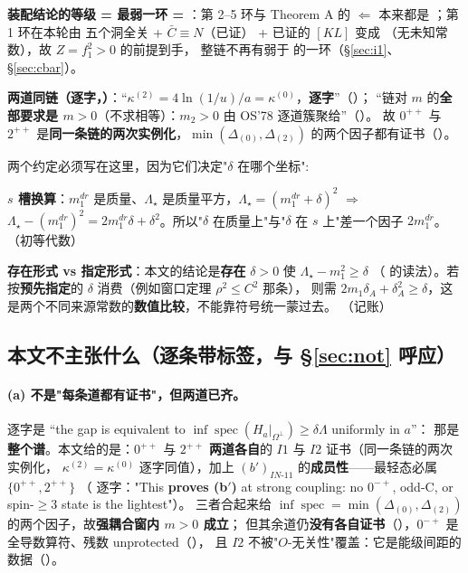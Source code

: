 \textbf{装配结论的等级 = 最弱一环 = \LT}：第 2--5 环与 Theorem A 的 $\Leftarrow$ 本来都是 \LT；第 1 环在本轮由
五个洞全关 + $\bar C\equiv N$（已证） + 已证的 $[KL]$ 变成 \LT{}（无未知常数），故 $Z=f_1^2>0$ 的前提到手，
整链不再有弱于 \LT{} 的一环（\S\ref{sec:i1}、\S\ref{sec:cbar}）。
\begin{quotebox}
\textbf{两道同链（逐字，）}：``$\kappa^{(2)}=4\ln(1/u)/a=\kappa^{(0)}$，\textbf{逐字}''（）；
``链对 $m$ 的\textbf{全部要求是 $m>0$}（不求相等）：$m_2>0$ 由 OS'78 逐道簇聚给''（）。
故 $0^{++}$ 与 $2^{++}$ 是\textbf{同一条链的两次实例化}，$\min(\Delta_{(0)},\Delta_{(2)})$ 的两个因子都有证书（）。
\end{quotebox}

两个约定必须写在这里，因为它们决定"$\delta$ 在哪个坐标":

\LM{} \textbf{$s$ 槽换算}：$m_1^{dr}$ 是质量、$\Lambda_\star$ 是质量平方，$\Lambda_\star=(m_1^{dr}+\delta)^2$
$\Rightarrow$ $\Lambda_\star-(m_1^{dr})^2=2m_1^{dr}\delta+\delta^2$。所以"$\delta$ 在质量上"与"$\delta$ 在 $s$ 上"差一个因子 $2m_1^{dr}$。
\LT{}（初等代数）

\LM{} \textbf{存在形式 vs 指定形式}：本文的结论是\textbf{存在} $\delta>0$ 使 $\Lambda_\star-m_1^2\ge\delta$
（ 的读法）。若按\textbf{预先指定}的 $\delta$ 消费（例如窗口定理 $\rho^2\le C^2$ 那条），
则需 $2m_1\delta_A+\delta_A^2\ge\delta$，这是两个不同来源常数的\textbf{数值比较}，不能靠符号统一蒙过去。
\LT{}（记账）

\subsection{本文不主张什么（逐条带标签，与 \S\ref{sec:not} 呼应）}

\paragraph{(a) 不是"每条道都有证书"，但两道已齐。}\LT
{} 逐字是
``the gap is equivalent to $\inf\operatorname{spec}(H_a|_{\Omega^\perp})\ge\delta\Lambda$ uniformly in $a$''：
那是\textbf{整个谱}。本文给的是：$0^{++}$ 与 $2^{++}$ \textbf{两道各自}的 $I1$ 与 $I2$ 证书（同一条链的两次实例化，
$\kappa^{(2)}=\kappa^{(0)}$ 逐字同值），加上 $(b')_{IN\text{-}11}$ 的\textbf{成员性}——最轻态必属 $\{0^{++},2^{++}\}$
（ 逐字："This \textbf{proves (b$'$)} at strong coupling: no $0^{-+}$, odd-C, or spin-$\ge3$ state is the lightest"）。
三者合起来给 $\inf\operatorname{spec}=\min(\Delta_{(0)},\Delta_{(2)})$ 的两个因子，故\textbf{强耦合窗内 $m>0$ 成立}；
但其余道仍\textbf{没有各自证书}（），$0^{-+}$ 是全导数算符、残数 unprotected（），
且 $I2$ 不被"$O$-无关性"覆盖：它是能级间距的数据（）。

